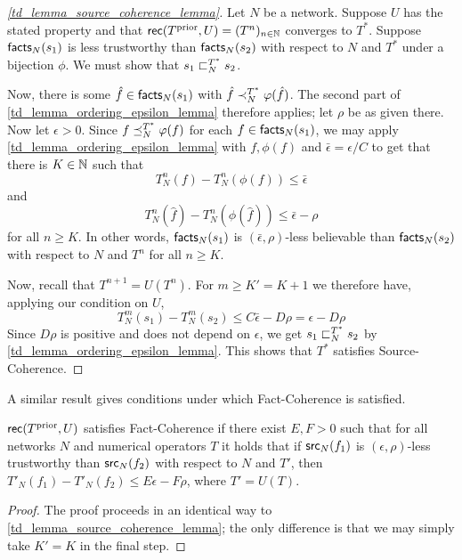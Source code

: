 \begin{proof}[\cref{td_lemma_source_coherence_lemma}]

Let $N$ be a network. Suppose $U$ has the stated property and that
$\mathsf{rec}(T^{\text{prior}}, U) = (T^n)_{n \in \mathbb{N}}$ converges to $T^*$. Suppose
$\mathsf{facts}_N(s_1)$ is less trustworthy than $\mathsf{facts}_N(s_2)$ with respect to $N$
and $T^*$ under a bijection $\phi$. We must show that $s_1 \sqsubset_N^{T^*} s_2$.

Now, there is some $\hat{f} \in \mathsf{facts}_N(s_1)$ with $\hat{f} \prec_N^{T^*}
\varphi(\hat{f})$. The second part of \cref{td_lemma_ordering_epsilon_lemma}
therefore applies; let $\rho$ be as given there. Now let $\epsilon > 0$.
Since $f \preceq_N^{T^*} \varphi(f)$ for each $f \in \mathsf{facts}_N(s_1)$, we may apply
\cref{td_lemma_ordering_epsilon_lemma} with $f, \phi(f)$ and
$\bar{\epsilon} = \epsilon / C$ to get that there is $K \in \mathbb{N}$ such that
\[
    T_N^n(f) - T_N^n(\phi(f)) \le \bar{\epsilon}
\]
and
\[
    T_N^n(\hat{f}) - T_N^n(\phi(\hat{f})) \le \bar{\epsilon} - \rho
\]
for all $n \ge K$. In other words, $\mathsf{facts}_N(s_1)$ is $(\bar{\epsilon},
\rho)$-less believable than $\mathsf{facts}_N(s_2)$ with respect to $N$ and $T^n$ for
all $n \ge K$.

Now, recall that $T^{n+1}=U(T^n)$. For $m \ge K' = K + 1$ we therefore have,
applying our condition on $U$,
\[
    T_N^m(s_1) - T_N^m(s_2) \le C\bar{\epsilon} - D\rho
    = \epsilon - D\rho
\]
Since $D\rho$ is positive and does not depend on $\epsilon$, we get $s_1
\sqsubset_N^{T^*} s_2$ by \cref{td_lemma_ordering_epsilon_lemma}. This shows that
$T^*$ satisfies Source-Coherence.
\end{proof}

A similar result gives conditions under which Fact-Coherence is satisfied.

\begin{lemma}
\label{td_lemma_fact_coherence_lemma}

$\mathsf{rec}(T^{\text{prior}}, U)$ satisfies Fact-Coherence if there exist $E, F > 0$
such that for all networks $N$ and numerical operators $T$ it holds that if
$\mathsf{src}_N(f_1)$ is $(\epsilon, \rho)$-less trustworthy than $\mathsf{src}_N(f_2)$ with
respect to $N$ and $T'$, then
    $T'_N(f_1) - T'_N(f_2) \le E\epsilon - F\rho$,
where $T' = U(T)$.

\end{lemma}

\begin{proof}
The proof proceeds in an identical way to \cref{td_lemma_source_coherence_lemma};
the only difference is that we may simply
take $K' = K$ in the final step.
\end{proof}

